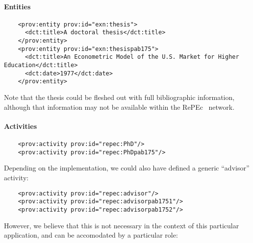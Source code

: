 \documentclass[x11names]{article}
\newcommand{\repec}{RePEc}
\begin{document}
\paragraph{Entities}
\begin{lstlisting}
    <prov:entity prov:id="exn:thesis">
      <dct:title>A doctoral thesis</dct:title>
    </prov:entity>
    <prov:entity prov:id="exn:thesispab175">
      <dct:title>An Econometric Model of the U.S. Market for Higher Education</dct:title>
      <dct:date>1977</dct:date>
    </prov:entity>
\end{lstlisting}
Note that the thesis could be fleshed out with full bibliographic information, although that information may not be available within the \repec~ network.
\paragraph{Activities}
\begin{lstlisting}
    <prov:activity prov:id="repec:PhD"/>
    <prov:activity prov:id="repec:PhDpab175"/>
\end{lstlisting}
Depending on the implementation, we could also have defined a generic ``advisor'' activity:
\begin{lstlisting}
    <prov:activity prov:id="repec:advisor"/>
    <prov:activity prov:id="repec:advisorpab1751"/>
    <prov:activity prov:id="repec:advisorpab1752"/>
\end{lstlisting}
However, we believe that this is not necessary in the context of this particular application, and can be accomodated by a particular role:
\end{document}
